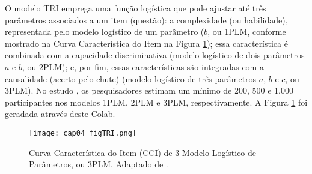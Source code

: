 
O modelo TRI emprega uma função logística que pode ajustar até três parâmetros associados a um item (questão): a complexidade (ou habilidade), representada pelo modelo logístico de um parâmetro (\(b\), ou 1PLM, conforme mostrado na Curva Característica do Item na Figura \ref{fig:cap04_figTRI}); essa característica é combinada com a capacidade discriminativa (modelo logístico de dois parâmetros \(a\) e \(b\), ou 2PLM); e, por fim, essas características são integradas com a causalidade (acerto pelo chute) (modelo logístico de três parâmetros \(a\), \(b\) e \(c\), ou 3PLM). No estudo \cite{min2021systematic}, os pesquisadores estimam um mínimo de 200, 500 e 1.000 participantes nos modelos 1PLM, 2PLM e 3PLM, respectivamente. A Figura \ref{fig:cap04_figTRI} foi geradada através deste \href{https://colab.research.google.com/drive/1ka7_SR_QB4G7ZPVvH3p_E0bZEbOH1vhK}{Colab}.

\begin{figure}[!ht]
  \centering
  \texttt{[image: cap04\_figTRI.png]}
  \caption{Curva Característica do Item (CCI) de 3-Modelo Logístico de Parâmetros, ou 3PLM. Adaptado de .}
  \label{fig:cap04_figTRI}
\end{figure}


